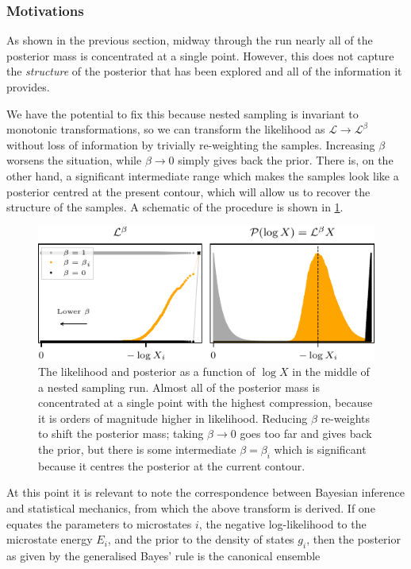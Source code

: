 \documentclass[usenatbib]{mnras}
\newcommand{\Like}{\mathcal{L}}
\begin{document}
\subsubsection*{Motivations}
As shown in the previous section, midway through the run nearly all of the posterior mass is concentrated at a single point. However, this does not capture the \textit{structure} of the posterior that has been explored and all of the information it provides. 
\par
We have the potential to fix this because nested sampling is invariant to monotonic transformations, so we can transform the likelihood as $\Like \to \Like^{\beta}$ without loss of information by trivially re-weighting the samples. Increasing $\beta$ worsens the situation, while $\beta \to 0$ simply gives back the prior. There is, on the other hand, a significant intermediate range which makes the samples look like a posterior centred at the present contour, which will allow us to recover the structure of the samples. A schematic of the procedure is shown in \cref{fig:last_live_point}.
\par
\begin{figure}
\begin{center}
    \includegraphics{figures/last_live_point.pdf}
\end{center}
\caption{The likelihood and posterior as a function of $\log X$ in the middle of a nested sampling run. Almost all of the posterior mass is concentrated at a single point with the highest compression, because it is orders of magnitude higher in likelihood. Reducing $\beta$ re-weights to shift the posterior mass; taking $\beta \to 0$ goes too far and gives back the prior, but there is some intermediate $\beta = \beta_i$ which is significant because it centres the posterior at the current contour.}
\label{fig:last_live_point}
\end{figure}
\par
At this point it is relevant to note the correspondence between Bayesian inference and statistical mechanics, from which the above transform is derived. If one equates the parameters to microstates $i$, the negative log-likelihood to the microstate energy $E_i$, and the prior to the density of states $g_i$, then the posterior as given by the generalised Bayes' rule is the canonical ensemble
\end{document}
